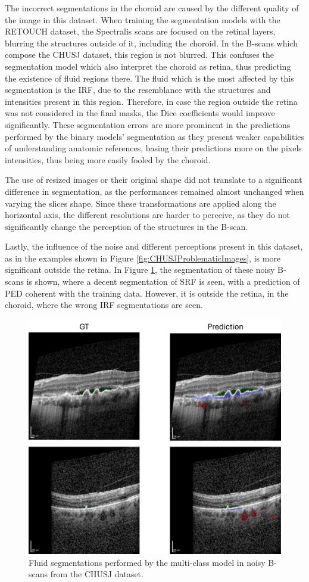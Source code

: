 The incorrect segmentations in the choroid are caused by the different quality of the image in this dataset. When training the segmentation models with the RETOUCH dataset, the Spectralis scans are focused on the retinal layers, blurring the structures outside of it, including the choroid. In the B-scans which compose the CHUSJ dataset, this region is not blurred. This confuses the segmentation model which also interpret the choroid as retina, thus predicting the existence of fluid regions there. The fluid which is the most affected by this segmentation is the IRF, due to the resemblance with the structures and intensities present in this region. Therefore, in case the region outside the retina was not considered in the final masks, the Dice coefficients would improve significantly. These segmentation errors are more prominent in the predictions performed by the binary models' segmentation as they present weaker capabilities of understanding anatomic references, basing their predictions more on the pixels intensities, thus being more easily fooled by the choroid.
\par
The use of resized images or their original shape did not translate to a significant difference in segmentation, as the performances remained almost unchanged when varying the slices shape. Since these transformations are applied along the horizontal axis, the different resolutions are harder to perceive, as they do not significantly change the perception of the structures in the B-scan.
\par
Lastly, the influence of the noise and different perceptions present in this dataset, as in the examples shown in Figure \ref{fig:CHUSJProblematicImages}, is more significant outside the retina. In Figure \ref{fig:CHUSJSegmentationOnNoisyScans}, the segmentation of these noisy B-scans is shown, where a decent segmentation of SRF is seen, with a prediction of PED coherent with the training data. However, it is outside the retina, in the choroid, where the wrong IRF segmentations are seen.

\begin{figure}[!ht]
	\centering	\includegraphics[width=0.75\linewidth]{figures/CHUSJSegmentationOnNoisyScans.png}
	\caption{Fluid segmentations performed by the multi-class model in noisy B-scans from the CHUSJ dataset.}
	\label{fig:CHUSJSegmentationOnNoisyScans}
\end{figure}

